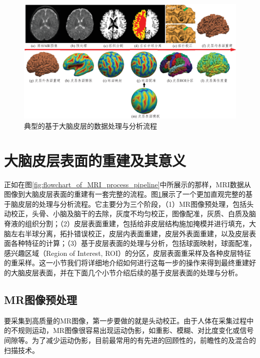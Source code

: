 \begin{figure}[t]
    \centering
    \includegraphics[width=\linewidth]{figure/flowchart_of_surface_based_analysis.eps}
    \caption{\label{fig:flowchart_of_surface_based_analysis}典型的基于大脑皮层的数据处理与分析流程}
\end{figure}


\section{大脑皮层表面的重建及其意义}
正如在图\ref{fig:flowchart_of_MRI_process_pipeline}中所展示的那样，MRI数据从图像到大脑皮层表面的重建有一套完整的流程。图\ref{fig:flowchart_of_surface_based_analysis}展示了一个更加直观完整的基于脑皮层的处理与分析流程。它主要分为三个阶段，（1）MR图像预处理，包括头动校正，头骨、小脑及脑干的去除，灰度不均匀校正，图像配准，灰质、白质及脑脊液的组织分割；（2）皮层表面重建，包括给非皮层结构施加掩模并进行填充，大脑左右半球分离，拓扑错误校正，皮层内表面重建，皮层外表面重建，以及皮层表面各种特征的计算；（3）基于皮层表面的处理与分析，包括球面映射，球面配准，感兴趣区域（Region of Interest, ROI）的分区，皮层表面重采样及各种皮层特征的重采样。这一小节我们将详细地介绍如何进行这每一步的操作来得到最终重建好的大脑皮层表面，并在下面几个小节介绍后续的基于皮层表面的处理与分析。

\subsection{MR图像预处理}\label{sec:MR图像预处理}
要采集到高质量的MR图像，第一步要做的就是头动校正\cite{zaitsev2015motion}。由于人体在采集过程中的不规则运动，MR图像很容易出现运动伪影，如重影、模糊、对比度变化或信号间隙等。为了减少运动伪影，目前最常用的有先进的回顾性的\cite{atkinson1999automatic}，前瞻性的\cite{zaitsev2006magnetic}及混合的\cite{aksoy2012hybrid}扫描技术。

